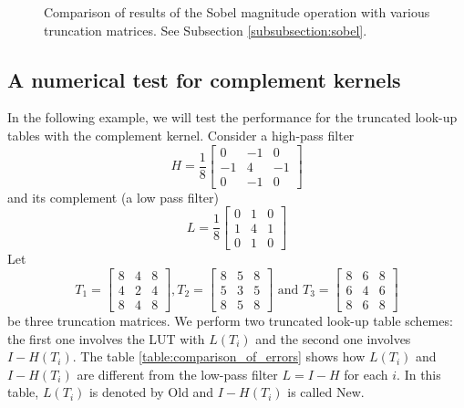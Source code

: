 \documentclass[12pt]{amsart}
\theoremstyle{definition}
\theoremstyle{remark}
\numberwithin{thm}{section}
\begin{document}
\begin{figure}[h]
\caption{Comparison of results of the Sobel magnitude operation with various truncation matrices. See Subsection \ref{subsubsection:sobel}.}
\label{fig:german_sobel} 
\end{figure}
\subsection{A numerical test for complement kernels}
In the following example, we will test the performance for the truncated look-up tables with the complement kernel. Consider a high-pass filter
$$H=
\frac{1}{8}
\begin{bmatrix}
0 & -1 & 0\\
-1 & 4 & -1\\
0 & -1 & 0
\end{bmatrix}$$
and its complement (a low pass filter)
$$L=
\frac{1}{8}
\begin{bmatrix}
0 & 1 & 0\\
1 & 4 & 1\\
0 & 1 & 0
\end{bmatrix}$$
Let $$
T_{1}=\left[
\begin{array}{ccc}
8 & 4 & 8 \\
4 & 2 & 4 \\
8 & 4 & 8
\end{array}
\right] ,T_{2}=\left[
\begin{array}{ccc}
8 & 5 & 8 \\
5 & 3 & 5 \\
8 & 5 & 8
\end{array}
\right] \mbox{ and }T_{3}=\left[
\begin{array}{ccc}
8 & 6 & 8 \\
6 & 4 & 6 \\
8 & 6 & 8
\end{array}
\right]
$$
be three truncation matrices. We perform two truncated look-up table schemes: the first one involves the LUT with $L(T_i)$ and the second one involves $I-H(T_i)$. The table \ref{table:comparison_of_errors} shows how $L(T_i)$ and $I-H(T_i)$ are different from the low-pass filter $L=I-H$ for each $i$. In this table, $L(T_i)$ is denoted by Old and $I-H(T_i)$ is called New. 
\end{document}
